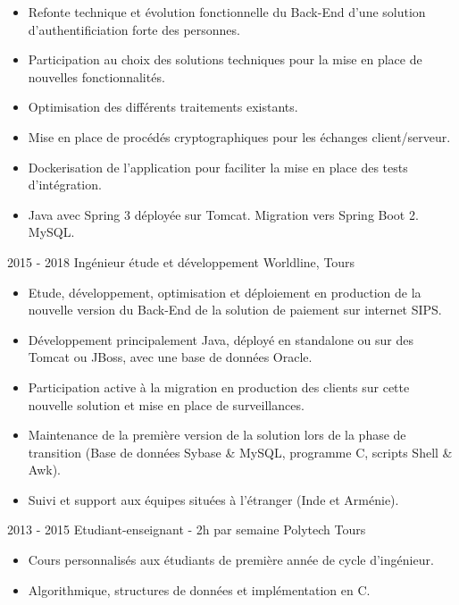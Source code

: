 \documentclass[]{friggeri-cv}
\begin{document}
\begin{entrylist}
{\begin{itemize}[leftmargin=*]
		\item Refonte technique et évolution fonctionnelle du Back-End d'une solution d'authentificiation forte des personnes.
		\item Participation au choix des solutions techniques pour la mise en place de nouvelles fonctionnalités.
		\item Optimisation des différents traitements existants.
		\item Mise en place de procédés cryptographiques pour les échanges client/serveur.
		\item Dockerisation de l'application pour faciliter la mise en place des tests d'intégration.
		\item Java avec Spring 3 déployée sur Tomcat. Migration vers Spring Boot 2. MySQL.
	\end{itemize}
	}
      \entry
    {2015 - 2018}
    {Ingénieur étude et développement}
    {Worldline, Tours}
    {
    \vspace{-0.8\baselineskip}
    \begin{itemize}[leftmargin=*]
		\item Etude, développement, optimisation et déploiement en production de la nouvelle version du Back-End de la solution de paiement sur internet SIPS.
		\item Développement principalement Java, déployé en standalone ou sur des Tomcat ou JBoss,  avec une base de données Oracle.
		\item Participation active à la migration en production des clients sur cette nouvelle solution et mise en place de surveillances.
		\item Maintenance de la première version de la solution lors de la phase de transition (Base de données Sybase \& MySQL, programme C, scripts Shell \& Awk).
		\item Suivi et support aux équipes situées à l'étranger (Inde et Arménie).
	\end{itemize}
}
    \entry
    {2013 - 2015}
    {Etudiant-enseignant - 2h par semaine}
    {Polytech Tours}
    {
    \vspace{-0.8\baselineskip}
	\begin{itemize}[leftmargin=*]
		\item Cours personnalisés aux étudiants de première année de cycle d'ingénieur. 
		\item Algorithmique, structures de données et implémentation en C.
	\end{itemize}
    }
\end{entrylist}
\end{document}
